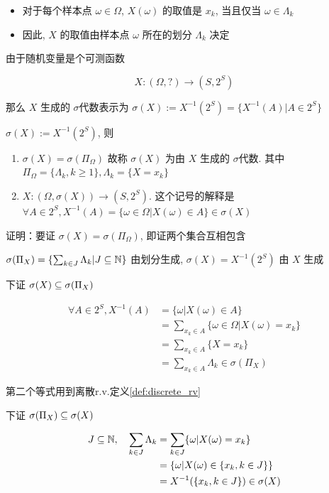 \begin{itemize}
    \item 对于每个样本点 $\omega\in \Omega$, $X(\omega)$ 的取值是 $x_k$, 当且仅当 $\omega\in \Lambda_k$
    \item 因此, $X$ 的取值由样本点 $\omega$ 所在的划分 $\Lambda_k$ 决定
\end{itemize}

由于随机变量是个可测函数 

\[
X:(\Omega, ?)\rightarrow (S,2^S)
\]

那么 $X$ 生成的 $\sigma$代数表示为 $\sigma(X):=X^{-1}(2^S)=\{X^{-1}(A)|A\in 2^S\}$

\begin{property}
$\sigma(X):=X^{-1}(2^S)$, 则

\begin{enumerate}
    \item $\sigma(X)=\sigma(\Pi_{\Omega})$ 故称 $\sigma(X)$ 为由 $X$ 生成的 $\sigma$代数. 其中 $\Pi_{\Omega}=\{\Lambda_k,k\geq 1\}, \Lambda_k=\{X=x_k\}$
    \item $X:(\Omega,\sigma(X))\rightarrow (S,2^S)$. 这个记号的解释是 $\forall A\in 2^S, X^{-1}(A)=\{\omega\in \Omega|X(\omega)\in A\}\in \sigma(X)$
\end{enumerate}
\end{property}

证明：要证 $\sigma(X)=\sigma(\Pi_{\Omega})$, 即证两个集合互相包含

$\sigma(\Pi_X)=\{\sum_{k\in J}\Lambda_k|J\subseteq \mathbb{N}\}$ 由划分生成, $\sigma(X)=X^{-1}(2^S)$ 由 $X$ 生成

下证 $\sigma(X)\subseteq \sigma(\Pi_X)$

\[
\begin{aligned}
    \forall A\in 2^S, X^{-1}(A)&=\{\omega|X(\omega)\in A\}\\
    &=\sum_{x_k\in A}\{\omega\in \Omega|X(\omega)=x_k\}\\
    &=\sum_{x_k\in A}\{X=x_k\}\\
    &=\sum_{x_k\in A} \Lambda_k \in \sigma(\Pi_X)
\end{aligned}
\]

第二个等式用到离散r.v.定义\ref{def:discrete_rv}

下证 $\sigma(\Pi_X)\subseteq \sigma(X)$

\[
\begin{aligned}
    J\subseteq \mathbb{N}, \quad \sum_{k\in J}\Lambda_k&=\sum_{k\in J}\{\omega|X(\omega)=x_k\}\\
    &=\{\omega|X(\omega)\in \{x_k,k\in J\}\}\\
    &=X^{-1}(\{x_k,k\in J\})\in \sigma(X)
\end{aligned}
\]

